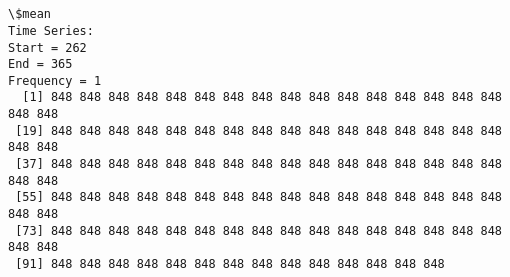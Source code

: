 \documentclass[11pt]{article}
\begin{document}
    \begin{center}
    \end{center}
    { \hspace*{\fill} \\}
    
    \begin{center}
    \end{center}
    { \hspace*{\fill} \\}
    
    \begin{Verbatim}[commandchars=\\\{\}]
\$mean
Time Series:
Start = 262 
End = 365 
Frequency = 1 
  [1] 848 848 848 848 848 848 848 848 848 848 848 848 848 848 848 848 848 848
 [19] 848 848 848 848 848 848 848 848 848 848 848 848 848 848 848 848 848 848
 [37] 848 848 848 848 848 848 848 848 848 848 848 848 848 848 848 848 848 848
 [55] 848 848 848 848 848 848 848 848 848 848 848 848 848 848 848 848 848 848
 [73] 848 848 848 848 848 848 848 848 848 848 848 848 848 848 848 848 848 848
 [91] 848 848 848 848 848 848 848 848 848 848 848 848 848 848


\end{Verbatim}
\end{document}
